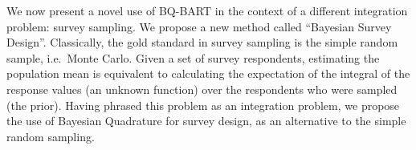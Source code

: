 


We now present a novel use of BQ-BART in the context of a different integration problem: survey sampling. We propose a new method called ``Bayesian Survey Design''. Classically, the gold standard in survey sampling is the simple random sample, i.e.~Monte Carlo. Given a set of survey respondents, estimating the population mean is equivalent to calculating the expectation of the integral of the response values (an unknown function) over the respondents who were sampled (the prior). Having phrased this problem as an integration problem, we propose the use of Bayesian Quadrature for survey design, as an alternative to the simple random sampling.

